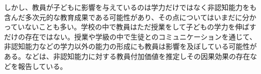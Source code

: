 \documentclass[a4paper,12pt]{article}
\begin{document}
しかし、教員が子どもに影響を与えているのは学力だけではなく非認知能力をも含んだ多次元的な教育成果である可能性があり、その点についてはいまだに分かっていないことも多い。学校の中で教員はただ授業をして子どもの学力を伸ばすだけの存在ではない。授業や学級の中で生徒とのコミュニケーションを通じて、非認知能力などの学力以外の能力の形成にも教員は影響を及ぼしている可能性がある。\cite{todo}などは、非認知能力に対する教員付加価値を推定しその因果効果の存在などを報告している。

\end{document}
